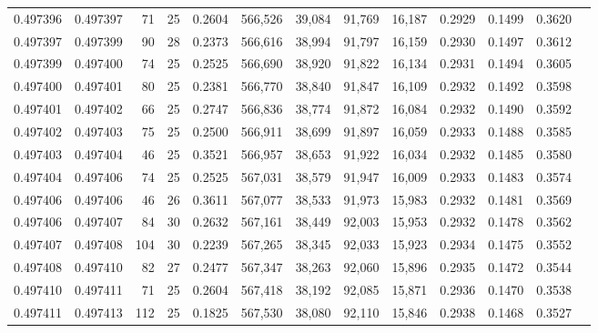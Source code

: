 \begin{tabular}{rrrrrrrrrrrrr}
0.497396 & 0.497397 &  71 &  25 &                                     0.2604 & 566,526 &  39,084 &  91,769 &  16,187 & 0.2929 & 0.1499 & 0.3620 \\
0.497397 & 0.497399 &  90 &  28 &                                     0.2373 & 566,616 &  38,994 &  91,797 &  16,159 & 0.2930 & 0.1497 & 0.3612 \\
0.497399 & 0.497400 &  74 &  25 &                                     0.2525 & 566,690 &  38,920 &  91,822 &  16,134 & 0.2931 & 0.1494 & 0.3605 \\
0.497400 & 0.497401 &  80 &  25 &                                     0.2381 & 566,770 &  38,840 &  91,847 &  16,109 & 0.2932 & 0.1492 & 0.3598 \\
0.497401 & 0.497402 &  66 &  25 &                                     0.2747 & 566,836 &  38,774 &  91,872 &  16,084 & 0.2932 & 0.1490 & 0.3592 \\
0.497402 & 0.497403 &  75 &  25 &                                     0.2500 & 566,911 &  38,699 &  91,897 &  16,059 & 0.2933 & 0.1488 & 0.3585 \\
0.497403 & 0.497404 &  46 &  25 &                                     0.3521 & 566,957 &  38,653 &  91,922 &  16,034 & 0.2932 & 0.1485 & 0.3580 \\
0.497404 & 0.497406 &  74 &  25 &                                     0.2525 & 567,031 &  38,579 &  91,947 &  16,009 & 0.2933 & 0.1483 & 0.3574 \\
0.497406 & 0.497406 &  46 &  26 &                                     0.3611 & 567,077 &  38,533 &  91,973 &  15,983 & 0.2932 & 0.1481 & 0.3569 \\
0.497406 & 0.497407 &  84 &  30 &                                     0.2632 & 567,161 &  38,449 &  92,003 &  15,953 & 0.2932 & 0.1478 & 0.3562 \\
0.497407 & 0.497408 & 104 &  30 &                                     0.2239 & 567,265 &  38,345 &  92,033 &  15,923 & 0.2934 & 0.1475 & 0.3552 \\
0.497408 & 0.497410 &  82 &  27 &                                     0.2477 & 567,347 &  38,263 &  92,060 &  15,896 & 0.2935 & 0.1472 & 0.3544 \\
0.497410 & 0.497411 &  71 &  25 &                                     0.2604 & 567,418 &  38,192 &  92,085 &  15,871 & 0.2936 & 0.1470 & 0.3538 \\
0.497411 & 0.497413 & 112 &  25 &                                     0.1825 & 567,530 &  38,080 &  92,110 &  15,846 & 0.2938 & 0.1468 & 0.3527 \\

\end{tabular}
